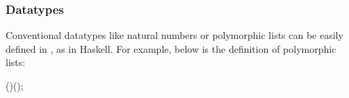\begin{comment}
Now we can evaluate some lambda expression and get the result back as
in Figure~\ref{fig:pex}

\begin{figure}[ht]
\begin{hscode}\SaveRestoreHook
\column{B}{@{}>{\hspre}l<{\hspost}@{}}%
\column{3}{@{}>{\hspre}l<{\hspost}@{}}%
\column{5}{@{}>{\hspre}l<{\hspost}@{}}%
\column{7}{@{}>{\hspre}l<{\hspost}@{}}%
\column{29}{@{}>{\hspre}l<{\hspost}@{}}%
\column{E}{@{}>{\hspre}l<{\hspost}@{}}%
\>[B]{}\mathbf{let}\;\Varid{show}\mathbin{:}\Conid{Value}\to \Varid{nat}\mathrel{=}{}\<[E]%
\\
\>[B]{}\hsindent{3}{}\<[3]%
\>[3]{}\lambda \Varid{e}\mathbin{:}\Conid{Value}.\,\mathbf{case}\;\Varid{e}\;\mathbf{of}{}\<[E]%
\\
\>[3]{}\hsindent{2}{}\<[5]%
\>[5]{}\Conid{VI}\;(\Varid{n}\mathbin{:}\Varid{nat}){}\<[29]%
\>[29]{}\Rightarrow \Varid{n}{}\<[E]%
\\
\>[B]{}\hsindent{3}{}\<[3]%
\>[3]{}\mid \Conid{VF}\;(\Varid{f}\mathbin{:}\Conid{Value}\to \Conid{Value})\Rightarrow \mathrm{10000}\mbox{\onelinecomment  impossible to reach}{}\<[E]%
\\
\>[B]{}\mathbf{in}{}\<[E]%
\\
\>[B]{}\mathbf{let}\;\Varid{example}\mathbin{:}\Conid{PLambda}\;\Conid{Value}\mathrel{=}{}\<[E]%
\\
\>[B]{}\hsindent{3}{}\<[3]%
\>[3]{}\Conid{App}\;\Conid{Value}\;{}\<[E]%
\\
\>[3]{}\hsindent{4}{}\<[7]%
\>[7]{}(\Conid{Lam}\;\Conid{Value}\;(\lambda \Varid{x}\mathbin{:}\Conid{Value}.\,\Conid{Var}\;\Conid{Value}\;\Conid{X}))\;{}\<[E]%
\\
\>[3]{}\hsindent{4}{}\<[7]%
\>[7]{}(\Conid{Num}\;\Conid{Value}\;\mathrm{42}){}\<[E]%
\\
\>[B]{}\mathbf{in}\;\Varid{show}\;(\Varid{eval}\;\Varid{example})\mbox{\onelinecomment  return 42}{}\<[E]%
\ColumnHook
\end{hscode}\resethooks
\caption{Example of using PHOAS}
\label{fig:pex}
\end{figure}
\end{comment}

\subsubsection{Datatypes}
Conventional datatypes like natural numbers or polymorphic lists can
be easily defined in \sufcc,   as in Haskell. For
example, below is the definition of polymorphic lists:
\begin{hscode}\SaveRestoreHook
{}%
%
%
\>[4]{}\;\;(\mathbin{:}\star)\mathrel{=}\mid {}\;\;(\;);{}\<[E]%
\ColumnHook
\end{hscode}\resethooks

